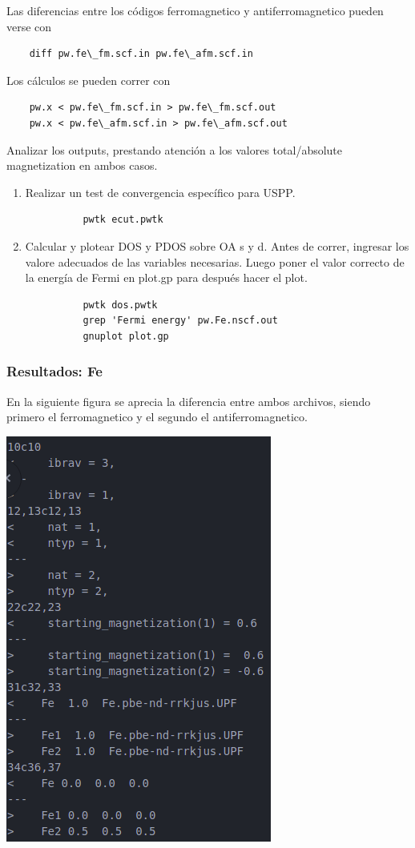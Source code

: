   Las diferencias entre los códigos ferromagnetico y antiferromagnetico pueden verse con
  \begin{verbatim}
    diff pw.fe\_fm.scf.in pw.fe\_afm.scf.in
  \end{verbatim}

  Los cálculos se pueden correr con
  \begin{verbatim}
    pw.x < pw.fe\_fm.scf.in > pw.fe\_fm.scf.out
    pw.x < pw.fe\_afm.scf.in > pw.fe\_afm.scf.out
  \end{verbatim}

  Analizar los outputs, prestando atención a los valores total/absolute magnetization en ambos casos.

    \begin{enumerate}
      \item Realizar un test de convergencia específico para USPP.
        \begin{verbatim}
          pwtk ecut.pwtk
        \end{verbatim}
      \item Calcular y plotear DOS y PDOS sobre OA s y d. Antes de correr, ingresar los valore adecuados de las variables necesarias. Luego poner el valor correcto de la energía de Fermi en plot.gp para después hacer el plot.
        \begin{verbatim}
          pwtk dos.pwtk
          grep 'Fermi energy' pw.Fe.nscf.out
          gnuplot plot.gp
        \end{verbatim}
    \end{enumerate}

\subsubsection{Resultados: Fe}

  En la siguiente figura se aprecia la diferencia entre ambos archivos, siendo primero el ferromagnetico y el segundo el antiferromagnetico.

    \includegraphics[scale = 0.45]{figs/D2/Fe_diff.png}


